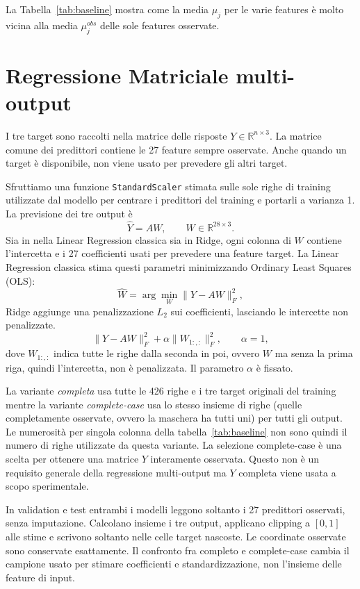 \documentclass[10pt,a4paper]{article}
\newcommand{\R}{\mathbb R}
\newcommand{\feat}[1]{\texttt{#1}}
\begin{document}
La Tabella~\ref{tab:baseline} mostra come la media $\mu_j$ per le varie features è molto vicina alla media 
$\mu_j^{obs}$ delle sole features osservate.
\section{Regressione Matriciale multi-output}
I tre target sono raccolti nella matrice delle risposte $Y\in\R^{n\times3}$. La matrice 
comune dei predittori contiene le 27 feature sempre osservate. Anche quando un target è disponibile, 
non viene usato per prevedere gli altri target.

Sfruttiamo una funzione \feat{StandardScaler} stimata sulle sole righe di training utilizzate dal modello 
per centrare i predittori del training e portarli a varianza 1. La previsione dei tre output è
\[
\widehat Y=AW,\qquad W\in\R^{28\times3}.
\]
Sia in nella Linear Regression classica sia in Ridge, ogni colonna di \(W\) contiene l’intercetta e i 27 coefficienti usati per 
prevedere una feature target. La Linear Regression classica stima questi parametri minimizzando Ordinary Least Squares (OLS):
\[
\widehat W=\arg\min_W\|Y-AW\|_F^2,
\]
Ridge aggiunge una penalizzazione \(L_2\) sui coefficienti, lasciando le intercette non penalizzate.
\[
\|Y-AW\|_F^2+\alpha\|W_{1:,:}\|_F^2,\qquad\alpha=1,
\]
dove $W_{1:,:}$ indica tutte le righe dalla seconda in poi, ovvero $W$ ma senza la prima riga, 
quindi l'intercetta, non è penalizzata. Il parametro $\alpha$ è fissato.

La variante \emph{completa} usa tutte le 426 righe e i tre target originali del training mentre la variante 
\emph{complete-case} usa lo stesso insieme di righe (quelle completamente osservate, ovvero la maschera ha tutti uni) 
per tutti gli output.
Le numerosità per singola colonna della tabella~\ref{tab:baseline} non sono quindi il numero di righe utilizzate
da questa variante. La selezione complete-case è una scelta per ottenere una matrice $Y$ interamente osservata.
Questo non è un requisito generale della regressione multi-output ma $Y$ completa viene usata a scopo sperimentale.

In validation e test entrambi i modelli leggono soltanto i 27 predittori osservati, senza imputazione. Calcolano insieme i tre 
output, applicano clipping a $[0,1]$ alle stime e scrivono soltanto nelle celle target nascoste. Le coordinate 
osservate sono conservate esattamente. Il confronto fra completo e complete-case cambia il campione usato per 
stimare coefficienti e standardizzazione, non l'insieme delle feature di input.
\end{document}
